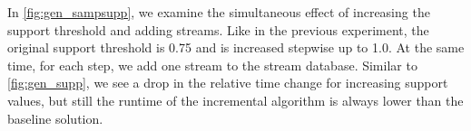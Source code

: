 
In \autoref{fig:gen_sampsupp}, we examine the simultaneous effect
of increasing the support threshold and adding streams.
Like in the previous experiment, the original support threshold is 0.75 and
is increased stepwise up to 1.0. At the same time, for each step, we add
one stream to the stream database.
Similar to \autoref{fig:gen_supp}, we see a drop in the relative time change
for increasing support values, but still the runtime of the incremental algorithm is
always lower than the baseline solution.



